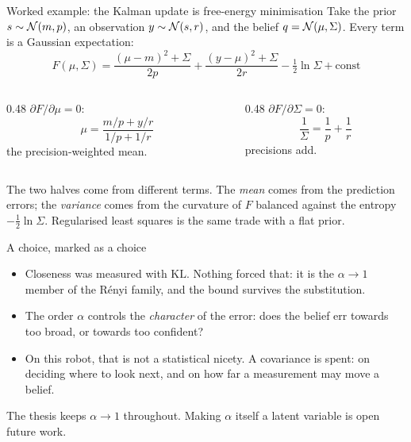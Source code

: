 \documentclass[10pt, aspectratio=169]{beamer}
\begin{document}
\begin{frame}{Worked example: the Kalman update is free-energy minimisation}
  \small
  Take the prior $s\sim\mathcal{N}(m,p)$, an observation $y\sim\mathcal{N}(s,r)$, and the belief $q=\mathcal{N}(\mu,\Sigma)$.
  Every term is a Gaussian expectation:
  \[
    F(\mu,\Sigma) = \frac{(\mu-m)^2+\Sigma}{2p} + \frac{(y-\mu)^2+\Sigma}{2r} - \tfrac12\ln\Sigma + \text{const}
  \]
  \pause
  \begin{columns}[T]
    \begin{column}{0.48\textwidth}
      $\partial F/\partial\mu = 0$:
      \[ \mu = \frac{m/p + y/r}{1/p + 1/r} \]
      the precision-weighted mean.
    \end{column}
    \begin{column}{0.48\textwidth}
      $\partial F/\partial\Sigma = 0$:
      \[ \frac1\Sigma = \frac1p + \frac1r \]
      precisions add.
    \end{column}
  \end{columns}
  \vspace{0.5em}
  \pause
  The two halves come from different terms. The \emph{mean} comes from the prediction errors; the
  \emph{variance} comes from the curvature of $F$ balanced against the entropy
  $-\tfrac12\ln\Sigma$. Regularised least squares is the same trade with a flat prior.
\end{frame}

\begin{frame}{A choice, marked as a choice}
  \begin{itemize}
    \item Closeness was measured with $\mathrm{KL}$. Nothing forced that: it is the $\alpha\to1$
          member of the Rényi family, and the bound survives the substitution.
    \item The order $\alpha$ controls the \emph{character} of the error: does the belief err
          towards too broad, or towards too confident?
    \item On this robot, that is not a statistical nicety. A covariance is \alert{spent}: on
          deciding where to look next, and on how far a measurement may move a belief.
  \end{itemize}
  \vspace{0.5em}
  The thesis keeps $\alpha\to1$ throughout. Making $\alpha$ itself a latent variable is open
  future work.
\end{frame}

\end{document}
